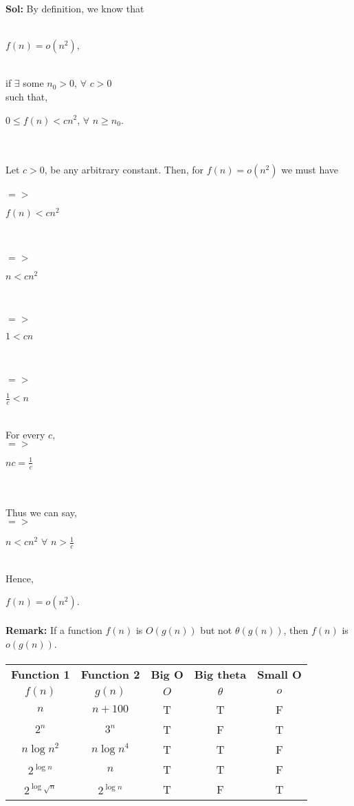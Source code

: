 \documentclass[a4paper, 12pt]{article}
\begin{document}
\paragraph{}
	\textbf{Sol:} By definition, we know that
	\\ \\ \centerline{$f(n) = o(n^{2})$,} 
	\\ \hspace*{\fill}if $\exists$ some $n_0 > 0$, $\forall$ $c > 0$ 
	\\such that, 
	\\ \centerline{$0 \leq f(n) < cn^{2}$, $\forall$ $n \geq n_{0}$.} 
	\\ \\Let $c > 0$, be any arbitrary constant. Then, for $f(n) = o(n^{2})$ we must have
	\\ \\$=>$ \centerline{  $f(n) < cn^{2}$ }                       
	\\ \\ $=>$ \centerline{$n < cn^{2}$}
	\\ \\ $=>$ \centerline{$1 < cn$}
	\\ \\ $=>$ \centerline{$\frac{1}{c} <n$}
	\\For every $c$, 
	\\ $=>$ \centerline{$nc = \frac{1}{c}$}
	\\ \\Thus we can say,
	\\ $=>$ \centerline{ $n < cn^{2}$ $\forall$ $n > \frac{1}{c}$}
	\\ Hence,
	\\ \centerline{$f(n) = o(n^{2})$.}
\paragraph{}
	\textbf{Remark:} If a function $f(n)$ is $O(g(n))$ but not $\theta(g(n))$, then $f(n)$ is $o(g(n))$. 
\paragraph{}
\begin{table}[h!]
	\begin{center}
		\label{tab:table1}
		\begin{tabular}{c|c|c|c|c}
			\textbf{Function 1} & \textbf{Function 2} & \textbf{Big O} & \textbf{Big theta} & \textbf{Small O}\\
			$f(n)$ & $g(n)$ & $O$ & $\theta$ & $o$ \\
			\hline
			$n$ & $n+100$ & T & T &	F\\
			$2^{n}$ & $3^{n}$ & T & F & T\\
			$n\log n^{2}$ & $n\log n^{4}$ & T & T & F\\
			$2^{\log n}$ & $n$ & T & T & F\\
			$2^{\log \sqrt{n}}$ & $2^{\log n}$ & T & F & T\\
		\end{tabular}
	\end{center}
	\end{table}
\end{document}
